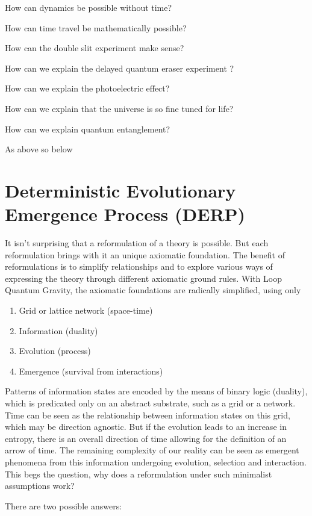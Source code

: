 \documentclass[notitlepage]{report}
\begin{document}
How can dynamics be possible without time?

How can time travel be mathematically possible?

How can the double slit experiment make sense?

How can we explain the delayed quantum eraser experiment ?

How can we explain the photoelectric effect?

How can we explain that the universe is so fine tuned for life?

How can we explain quantum entanglement?

As above so below


\section{Deterministic Evolutionary  Emergence Process (DERP)}
It isn't surprising that a reformulation of a theory is possible.  But each reformulation brings with it an unique axiomatic foundation. The benefit of reformulations is to simplify relationships and to explore various ways of expressing the theory through different axiomatic ground rules. With Loop Quantum Gravity, the axiomatic foundations are radically simplified, using only

\begin{enumerate}
	\item  Grid or lattice network (space-time)
	\item  Information (duality)
	\item  Evolution (process)
	\item  Emergence (survival from interactions)
	
\end{enumerate}
Patterns of information states are encoded by the means of binary logic (duality), which is predicated only on an abstract substrate, such as a grid  or a network. Time can be seen as the relationship between information states on this grid, which may be direction agnostic. But if the evolution leads to an increase in entropy, there is an overall direction of time allowing for the definition of an arrow of time. The remaining complexity of our reality can be seen as emergent phenomena from this information undergoing evolution, selection and interaction. This begs the question, why does a reformulation under such minimalist assumptions work?

There are two possible answers:
\end{document}
